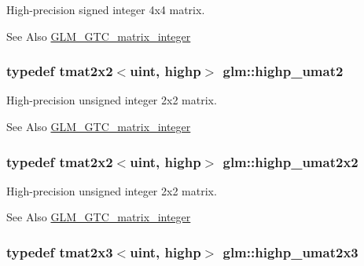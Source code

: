 High-\/precision signed integer 4x4 matrix. \begin{DoxySeeAlso}{See Also}
\hyperlink{group__gtc__matrix__integer}{G\-L\-M\-\_\-\-G\-T\-C\-\_\-matrix\-\_\-integer} 
\end{DoxySeeAlso}
\hypertarget{group__gtc__matrix__integer_ga113fe97aa8688eaa287a02f8362f3e47}{
\subsubsection[{highp\-\_\-umat2}]{\setlength{\rightskip}{0pt plus 5cm}typedef tmat2x2$<$uint, highp$>$ {\bf glm\-::highp\-\_\-umat2}}}\label{group__gtc__matrix__integer_ga113fe97aa8688eaa287a02f8362f3e47}
High-\/precision unsigned integer 2x2 matrix. \begin{DoxySeeAlso}{See Also}
\hyperlink{group__gtc__matrix__integer}{G\-L\-M\-\_\-\-G\-T\-C\-\_\-matrix\-\_\-integer} 
\end{DoxySeeAlso}
\hypertarget{group__gtc__matrix__integer_gaeb546847abfc7c3c09ea8172987ebb16}{
\subsubsection[{highp\-\_\-umat2x2}]{\setlength{\rightskip}{0pt plus 5cm}typedef tmat2x2$<$uint, highp$>$ {\bf glm\-::highp\-\_\-umat2x2}}}\label{group__gtc__matrix__integer_gaeb546847abfc7c3c09ea8172987ebb16}
High-\/precision unsigned integer 2x2 matrix. \begin{DoxySeeAlso}{See Also}
\hyperlink{group__gtc__matrix__integer}{G\-L\-M\-\_\-\-G\-T\-C\-\_\-matrix\-\_\-integer} 
\end{DoxySeeAlso}
\hypertarget{group__gtc__matrix__integer_gab058a0a12ea7f604d92baeb7a0e54f3b}{
\subsubsection[{highp\-\_\-umat2x3}]{\setlength{\rightskip}{0pt plus 5cm}typedef tmat2x3$<$uint, highp$>$ {\bf glm\-::highp\-\_\-umat2x3}}}\label{group__gtc__matrix__integer_gab058a0a12ea7f604d92baeb7a0e54f3b}

